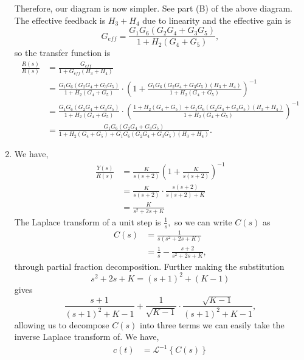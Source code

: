 \documentclass{article}
\numberwithin{equation}{section}
\begin{document}
\begin{enumerate}[label=\textbf{1.\arabic*}]
\begin{equation}
    \end{equation}
    Therefore, our diagram is now simpler. See part (B) of the above diagram. The effective feedback is $H_3+H_4$ due to linearity and the effective gain is 
    \begin{equation}
        G_{eff} = \frac{G_1G_6(G_2G_4+G_3G_5)}{1+H_2(G_4+G_5)},
    \end{equation}
    so the transfer function is 
    \begin{align}
        \frac{R(s)}{R(s)} &= \frac{G_{eff}}{1+G_{eff}(H_3+H_4)} \\ 
        &= \frac{G_1G_6(G_2G_4+G_3G_5)}{1+H_2(G_4+G_5)} \cdot \left(1 + \frac{G_1G_6(G_2G_4+G_3G_5)(H_3+H_4)}{1+H_2(G_4+G_5)}\right)^{-1} \\ 
        &= \frac{G_1G_6(G_2G_4+G_3G_5)}{1+H_2(G_4+G_5)} \cdot \left(\frac{1 + H_2(G_4+G_5) + G_1G_6(G_2G_4+G_3G_5)(H_3+H_4)}{1+H_2(G_4+G_5)}\right)^{-1} \\ 
        &= \boxed{\frac{G_1G_6(G_2G_4+G_3G_5)}{1+H_2(G_4+G_5)+G_1G_6(G_2G_4+G_3G_5)(H_3+H_4)}}.
    \end{align}
    \item We have,
    \begin{align}
        \frac{Y(s)}{R(s)} &= \frac{K}{s(s+2)}\left(1 + \frac{K}{s(s+2)}\right)^{-1} \\ 
        &= \frac{K}{s(s+2)} \cdot \frac{s(s+2)}{s(s+2)+K} \\ 
        &= \frac{K}{s^2+2s+K}
    \end{align}
    The Laplace transform of a unit step is $\frac{1}{s},$ so we can write $C(s)$ as 
    \begin{align}
        C(s) &= \frac{1}{s(s^2+2s+K)} \\ 
        &= \frac{1}{s} - \frac{s+2}{s^2+2s+K},
    \end{align}
    through partial fraction decomposition. Further making the substitution
    \begin{equation}
        s^2+2s+K = (s+1)^2 + (K-1)
    \end{equation}
    gives 
    \begin{equation}
        \frac{s+1}{(s+1)^2 + K - 1} + \frac{1}{\sqrt{K-1}} \cdot \frac{\sqrt{K-1}}{(s+1)^2 + K -1},
    \end{equation}
    allowing us to decompose $C(s)$ into three terms we can easily take the inverse Laplace transform of. We have,
    \begin{align}
        c(t) &= \mathcal{L}^{-1}\left\{C(s)\right\} \\ 

\end{align}
\end{enumerate}
\end{document}
